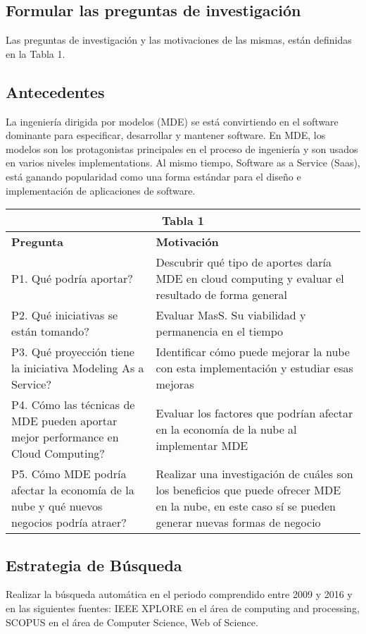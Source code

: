 \documentclass{llncs}
\begin{document}
\subsection{Formular las preguntas de investigación}
Las preguntas de investigación y las motivaciones de las mismas, están definidas en la Tabla 1.

\subsection{Antecedentes}
La ingeniería dirigida por modelos (MDE) se está convirtiendo en el software dominante para especificar,
desarrollar y mantener software. En MDE, los modelos son los protagonistas principales en el proceso
de ingeniería y son usados en varios niveles implementations.
Al mismo tiempo, Software as a Service (Saas), está ganando popularidad como una forma estándar para el diseño
e implementación de aplicaciones de software.



\begin{tabular}{  | p{5cm} | p{7cm}  | }
  \hline
  \multicolumn{2}{|c|}{\bf Tabla 1} \\
  \hline
  \bf Pregunta & \bf Motivación \\
  \hline
  P1. Qué podría aportar?  & Descubrir qué tipo de aportes daría MDE en cloud computing y evaluar el resultado de forma general\\
  \hline
  P2. Qué iniciativas se están tomando? & Evaluar MasS. Su viabilidad y permanencia en el tiempo\\
  \hline
  P3. Qué proyección tiene la iniciativa Modeling As a Service? & Identificar cómo puede mejorar la nube con esta implementación y estudiar esas mejoras\\
  \hline
  P4. Cómo las técnicas de MDE pueden aportar mejor performance en Cloud Computing?  & Evaluar los factores que podrían afectar en la economía de la nube al implementar MDE\\
  \hline
  P5. Cómo MDE podría afectar la economía de la nube y qué nuevos negocios podría atraer? & Realizar una investigación de cuáles son los beneficios que puede ofrecer MDE en la nube, en este caso sí se pueden generar nuevas formas de negocio\\
  \hline
\end{tabular}

\subsection{Estrategia de Búsqueda}
Realizar la búsqueda automática  en el periodo comprendido entre 2009 y 2016 y en las siguientes fuentes: IEEE XPLORE en el área de computing and processing, SCOPUS en el área de Computer Science, Web of Science.
\end{document}
